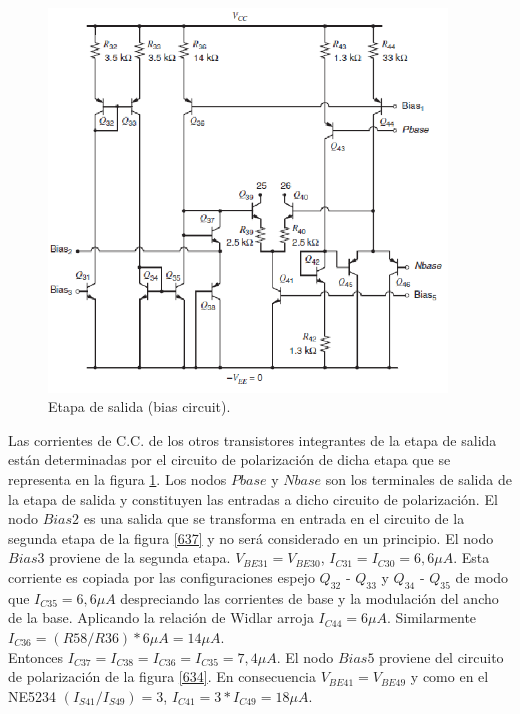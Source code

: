 \documentclass[12pt,a4paper,final,headinclude,footinclude,BCOR5mm]{scrartcl}
\begin{document}
\begin{figure}[!h]
\begin{center}
\includegraphics[width=300pt]{./imagenes/biasoutput.png}
\end{center}
\caption{Etapa de salida (bias circuit).}
\label{640}
\end{figure}

Las corrientes de C.C. de los otros transistores integrantes de la etapa de salida están determinadas por el circuito de polarización de dicha etapa que se representa en la figura \ref{640}. Los nodos $Pbase$ y $Nbase$ son los terminales de salida de la etapa de salida y constituyen las entradas a dicho circuito de polarización. El nodo $Bias2$ es una salida que se transforma en entrada en el circuito de la segunda etapa de la figura \ref{637} y no será considerado en un principio. El nodo $Bias3$ proviene de la segunda etapa. $V_{BE31} = V_{BE30}$, $I_{C31} = I_{C30} = 6,6 \mu A$. Esta corriente es copiada por las configuraciones espejo $Q_{32}$ - $Q_{33}$  y $Q_{34}$ - $Q_{35}$ de modo que $I_{C35} = 6,6 \mu A$ despreciando las corrientes de base y la modulación del ancho de la base. Aplicando la relación de Widlar arroja  $I_{C44} = 6 \mu A$. Similarmente $I_{C36}  = (R58/R36) * 6 \mu A = 14 \mu A$.\\

Entonces $I_{C37} = I_{C38} = I_{C36} = I_{C35} = 7,4 \mu A$. El nodo $Bias5$ proviene del circuito de polarización de la figura \ref{634}. En consecuencia $V_{BE41} = V_{BE49}$ y como en el NE5234 $(I_{S41} / I_{S49}) =  3$, $I_{C41} = 3*I_{C49} = 18 \mu A$.\\
\end{document}
